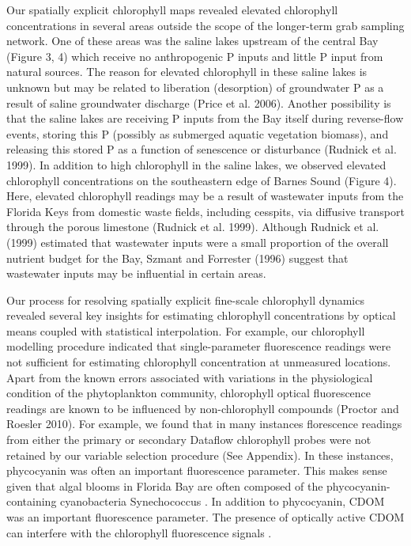Our spatially explicit chlorophyll maps revealed elevated chlorophyll concentrations in several areas outside the scope of the longer-term grab sampling network. One of these areas was the saline lakes upstream of the central Bay (Figure 3, 4) which receive no anthropogenic P inputs and little P input from natural sources. The reason for elevated chlorophyll in these saline lakes is unknown but may be related to liberation (desorption) of groundwater P as a result of saline groundwater discharge (Price et al. 2006). Another possibility is that the saline lakes are receiving P inputs from the Bay itself during reverse-flow events, storing this P (possibly as submerged aquatic vegetation biomass), and releasing this stored P as a function of senescence or disturbance (Rudnick et al. 1999).  In addition to high chlorophyll in the saline lakes, we observed elevated chlorophyll concentrations on the southeastern edge of Barnes Sound (Figure 4). Here, elevated chlorophyll readings may be a result of wastewater inputs from the Florida Keys from domestic waste fields, including cesspits, via diffusive transport through the porous limestone (Rudnick et al. 1999). Although Rudnick et al. (1999) estimated that wastewater inputs were a small proportion of the overall nutrient budget for the Bay, Szmant and Forrester (1996) suggest that wastewater inputs may be influential in certain areas. 

Our process for resolving spatially explicit fine-scale chlorophyll dynamics revealed several key insights for estimating chlorophyll concentrations by optical means coupled with statistical interpolation. For example, our chlorophyll modelling procedure indicated that single-parameter fluorescence readings were not sufficient for estimating chlorophyll concentration at unmeasured locations. Apart from the known errors associated with variations in the physiological condition of the phytoplankton community, chlorophyll optical fluorescence readings are known to be influenced by non-chlorophyll compounds (Proctor and Roesler 2010). For example, we found that in many instances florescence readings from either the primary or secondary Dataflow chlorophyll probes were not retained by our variable selection procedure (See Appendix). In these instances, phycocyanin was often an important fluorescence parameter. This makes sense given that algal blooms in Florida Bay are often composed of the phycocyanin-containing cyanobacteria Synechococcus \cite{phlips_blooms_1999}. In addition to phycocyanin, CDOM was an important fluorescence parameter. The presence of optically active CDOM can interfere with the chlorophyll fluorescence signals \cite{proctor2010new}. 

